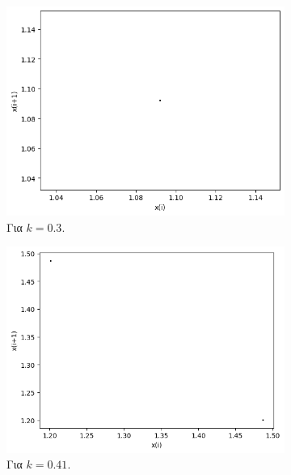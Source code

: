 \begin{figure}[h!]
	\centering	
	\begin{subfigure}[b]{0.4\linewidth}
		\centering
		\includegraphics[width=\linewidth]{LateX images/graphs/k03}
		\caption{Για $k=0.3$.}
		\label{f:k1}
	\end{subfigure}
	\hfill
	\begin{subfigure}[b]{0.4\textwidth}
		\centering
		\includegraphics[width=\textwidth]{LateX images/graphs/k041}
		\caption{Για $k=0.41$.}
		\label{f:k2}
	\end{subfigure}
	\hfill
	\begin{subfigure}[b]{0.4\textwidth}
		\centering

\end{subfigure}
\end{figure}
